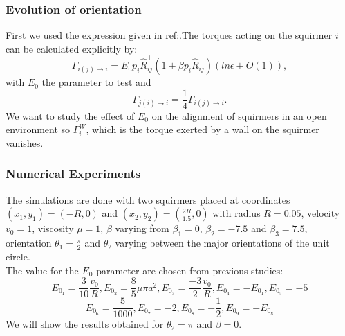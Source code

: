 \documentclass{article}
\begin{document}
\subsubsection*{Evolution of orientation}
First we used the expression given in ref:\cite{Lauga}.The torques acting on the squirmer $i$ can
 be calculated explicitly by:
$$
\Gamma_{i(j)\rightarrow i} = E_0p_i\hat{R}_{ij}^{\perp}(1 + \beta p_i\hat{R}_{ij})(ln \epsilon + O(1)),
$$
with $E_0$ the parameter to test and
$$
\Gamma_{j(i)\rightarrow i} = \frac{1}{4}\Gamma_{i(j)\rightarrow i}.
$$
We want to study the effect of $E_0$ on the alignment of squirmers in an open environment so $\Gamma_{i}^W$, which is the torque 
exerted by a wall on the squirmer vanishes.

\subsubsection*{Numerical Experiments}
The simulations are done with two squirmers placed at coordinates $(x_1, y_1) = (-R, 0)$ and $(x_2, y_2) = (\frac{2R}{1.5}, 0)$ with radius $R=0.05$, velocity $v_0=1$, viscosity $\mu = 1$, $\beta$ varying from $\beta_1 = 0$,
 $\beta_2 = -7.5$ and $\beta_3 = 7.5$, orientation $\theta_1 = \frac{\pi}{2}$ and $\theta_2$ varying between the major orientations of the unit circle.\\
 The value for the $E_0$ parameter are chosen from previous studies\cite{Brumley}\cite{Lauga}:
 $$
 E_{0_{1}} = \frac{3}{10}\frac{v_0}{R}, E_{0_{2}} = \frac{8}{5}\mu\pi a^2, E_{0_{3}} = \frac{-3}{2}\frac{v_0}{R},
 E_{0_{4}} = -E_{0_{1}}, E_{0_{5}} = -5$$
 $$
 E_{0_{6}} = \frac{5}{1000}, E_{0_{7}} = -2, E_{0_{8}} = -\frac{1}{2}, E_{0_{9}} = -E_{0_{8}}
 $$
We will show the results obtained for $\theta_2 = \pi$ and $\beta = 0$.
\end{document}
